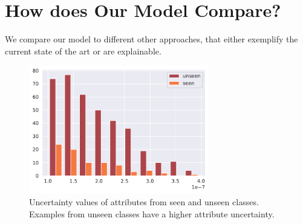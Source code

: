 \documentclass[a4paper,cleardoubleempty,BCOR1cm, 11pt]{report}
\begin{document}








\section{How does Our Model Compare?}\label{sec:results}
We compare our model to different other approaches, that either exemplify the current state of the art or are explainable.

\begin{figure}[t!]
	\centering
		\includegraphics[width=0.7\textwidth]{images/zero_shot_class_uncertainty_median_hist.pdf}
\caption{Uncertainty values of attributes from seen and unseen classes. Examples from unseen classes have a higher attribute uncertainty.}
\label{fig:zero_shot_uncert}
\end{figure}
\end{document}
